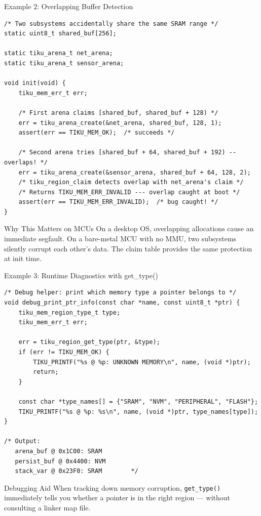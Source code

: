 \documentclass[aspectratio=169, 10pt]{beamer}
\begin{document}
\begin{frame}[fragile]{Example 2: Overlapping Buffer Detection}
\begin{lstlisting}[style=cstyle]
/* Two subsystems accidentally share the same SRAM range */
static uint8_t shared_buf[256];

static tiku_arena_t net_arena;
static tiku_arena_t sensor_arena;

void init(void) {
    tiku_mem_err_t err;

    /* First arena claims [shared_buf, shared_buf + 128) */
    err = tiku_arena_create(&net_arena, shared_buf, 128, 1);
    assert(err == TIKU_MEM_OK);  /* succeeds */

    /* Second arena tries [shared_buf + 64, shared_buf + 192) -- overlaps! */
    err = tiku_arena_create(&sensor_arena, shared_buf + 64, 128, 2);
    /* tiku_region_claim detects overlap with net_arena's claim */
    /* Returns TIKU_MEM_ERR_INVALID --- overlap caught at boot */
    assert(err == TIKU_MEM_ERR_INVALID);  /* bug caught! */
}
\end{lstlisting}

\vspace{0.3em}
\begin{block}{Why This Matters on MCUs}
On a desktop OS, overlapping allocations cause an immediate segfault.
On a bare-metal MCU with no MMU, two subsystems silently corrupt each
other's data.  The claim table provides the same protection at init time.
\end{block}
\end{frame}

\begin{frame}[fragile]{Example 3: Runtime Diagnostics with get\_type()}
\begin{lstlisting}[style=cstyle]
/* Debug helper: print which memory type a pointer belongs to */
void debug_print_ptr_info(const char *name, const uint8_t *ptr) {
    tiku_mem_region_type_t type;
    tiku_mem_err_t err;

    err = tiku_region_get_type(ptr, &type);
    if (err != TIKU_MEM_OK) {
        TIKU_PRINTF("%s @ %p: UNKNOWN MEMORY\n", name, (void *)ptr);
        return;
    }

    const char *type_names[] = {"SRAM", "NVM", "PERIPHERAL", "FLASH"};
    TIKU_PRINTF("%s @ %p: %s\n", name, (void *)ptr, type_names[type]);
}

/* Output:
   arena_buf @ 0x1C00: SRAM
   persist_buf @ 0x4400: NVM
   stack_var @ 0x23F0: SRAM        */
\end{lstlisting}

\begin{block}{Debugging Aid}
When tracking down memory corruption, \texttt{get\_type()} immediately
tells you whether a pointer is in the right region --- without
consulting a linker map file.
\end{block}
\end{frame}
\end{document}
